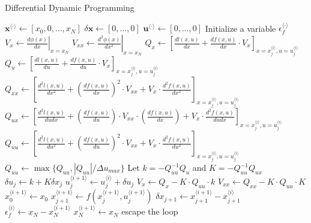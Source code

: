 \documentclass{article}
\begin{document}
\begin{algorithm}[t]
\caption{Differential Dynamic Programming}\label{DDP}
\renewcommand{\algorithmicrequire}{\textbf{Input:}}
\begin{algorithmic}[1]
\State $\mathbf{x}^{\langle \cdot \rangle}\leftarrow [x_0,0,\ldots,x_N]$
\State $\delta\mathbf{x}\leftarrow [0,\ldots,0]$
\State $\mathbf{u}^{\langle \cdot \rangle}\leftarrow [0,\ldots,0]$
\State Initialize a variable $\epsilon_f^{\langle \cdot \rangle}$
\textcolor{gray}{}
\State $V_x \leftarrow \left.\frac{d\phi(x)}{dx}\right|_{x=x_N}$
\State $V_{xx} \leftarrow \left.\frac{d^2\phi(x)}{dx^2}\right|_{x=x_N}$
 \textcolor{gray}{}
\State $Q_x \leftarrow \left[\frac{dl(x,u)}{dx}+\frac{df(x,u)}{dx}\cdot V_x\right]_{x=x_j^{\langle i \rangle},u=u_j^{\langle i \rangle}}$
\State $Q_u \leftarrow \left[\frac{dl(x,u)}{du}+\frac{df(x,u)}{du}\cdot V_x\right]_{x=x_j^{\langle i \rangle},u=u_j^{\langle i \rangle}}$
\State $Q_{xx} \leftarrow \left[\frac{d^2l(x,u)}{dx^2}+\left(\frac{df(x,u)}{dx}\right)^2\cdot V_{xx} + V_x \cdot \frac{d^2f(x,u)}{dx^2}\right]_{x=x_j^{\langle i \rangle},u=u_j^{\langle i \rangle}}$
\State $Q_{ux} \leftarrow \left[\frac{d^2l(x,u)}{dudx}+\left(\frac{df(x,u)}{du}\right)\cdot V_{xx} \cdot \left(\frac{df(x,u)}{dx}\right) + V_x \cdot \frac{d^2f(x,u)}{dudx}\right]_{x=x_j^{\langle i \rangle},u=u_j^{\langle i \rangle}}$
\State $Q_{uu} \leftarrow \left[\frac{d^2l(x,u)}{du^2}+\left(\frac{df(x,u)}{du}\right)^2\cdot V_{xx} + V_x \cdot \frac{d^2f(x,u)}{du^2}\right]_{x=x_j^{\langle i \rangle},u=u_j^{\langle i \rangle}}$
\State $Q_{uu} \leftarrow \max\{Q_{uu},|Q_{uu}|/\Delta u_{max}\}$
\EndIf
\State Let $k=-Q_{uu}^{-1}Q_{u}$ and $K=-Q_{uu}^{-1}Q_{ux}$
\State $\delta u_j \leftarrow k+K\delta x_j$\textcolor{gray}{}
\State $ u_j^{\langle i+1\rangle} \leftarrow u_j^{\langle i\rangle} + \delta u_j$
\State $V_x \leftarrow Q_x-K\cdot Q_{uu}\cdot k$\textcolor{gray}{}
\State $V_{xx} \leftarrow Q_{xx}-K\cdot Q_{uu}\cdot K$
\EndFor
\State $x_0^{\langle i+1 \rangle} \leftarrow x_0$
\textcolor{gray}{}
\State $x_{j+1}^{\langle i+1 \rangle} \leftarrow f(x_j^{\langle i+1 \rangle},u_j^{\langle i+1 \rangle})$
\State $\delta x_{j+1} \leftarrow x_{j+1}^{\langle i+1 \rangle} - x_{j+1}^{\langle i \rangle}$
\EndFor
\State $\epsilon_f^{\langle i \rangle} \leftarrow x_N - x_N^{\langle i+1 \rangle}$
\State $x_N^{\langle i+1 \rangle} \leftarrow x_N$
escape the loop
\EndIf
\EndFor
\end{algorithmic}
\end{algorithm}
\end{document}
